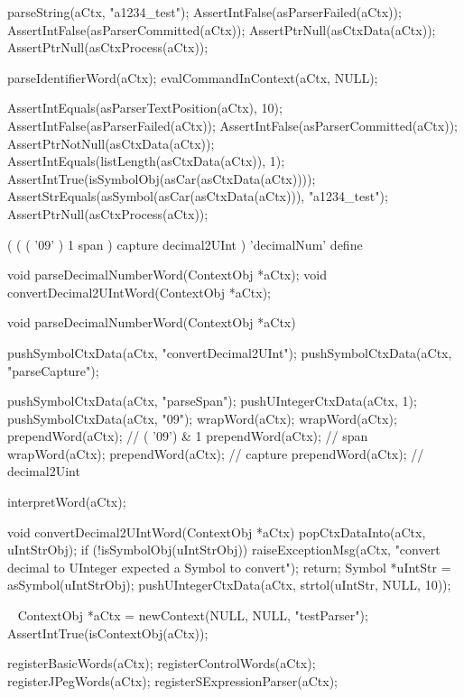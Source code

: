 \startCTest
  parseString(aCtx, "a1234_test");
  AssertIntFalse(asParserFailed(aCtx));
  AssertIntFalse(asParserCommitted(aCtx));
  AssertPtrNull(asCtxData(aCtx));
  AssertPtrNull(asCtxProcess(aCtx));
  
  parseIdentifierWord(aCtx);
  evalCommandInContext(aCtx, NULL);
  
  AssertIntEquals(asParserTextPosition(aCtx), 10);
  AssertIntFalse(asParserFailed(aCtx));
  AssertIntFalse(asParserCommitted(aCtx));
  AssertPtrNotNull(asCtxData(aCtx));
  AssertIntEquals(listLength(asCtxData(aCtx)), 1);
  AssertIntTrue(isSymbolObj(asCar(asCtxData(aCtx))));
  AssertStrEquals(asSymbol(asCar(asCtxData(aCtx))), "a1234_test");
  AssertPtrNull(asCtxProcess(aCtx));
\stopCTest
\stopTestCase
\stopTestSuite

\startTestSuite[parseDecimalNumberWord]

\starttyping
(
  (
    ( '09' ) 1 span
  ) capture decimal2UInt
) 'decimalNum' define
\stoptyping

\startCHeader
void parseDecimalNumberWord(ContextObj *aCtx);
void convertDecimal2UIntWord(ContextObj *aCtx);
\stopCHeader

\startCCode
void parseDecimalNumberWord(ContextObj *aCtx) {

  pushSymbolCtxData(aCtx, "convertDecimal2UInt");
  pushSymbolCtxData(aCtx, "parseCapture");
  
  pushSymbolCtxData(aCtx, "parseSpan");
  pushUIntegerCtxData(aCtx, 1);
  pushSymbolCtxData(aCtx, "09");
  wrapWord(aCtx);
  wrapWord(aCtx);
  prependWord(aCtx); // ( '09') & 1
  prependWord(aCtx); // span
  wrapWord(aCtx);
  prependWord(aCtx); // capture
  prependWord(aCtx); // decimal2Uint
  
  interpretWord(aCtx);
}

void convertDecimal2UIntWord(ContextObj *aCtx) {
  popCtxDataInto(aCtx, uIntStrObj);
  if (!isSymbolObj(uIntStrObj)) {
    raiseExceptionMsg(aCtx,
      "convert decimal to UInteger expected a Symbol to convert");
    return;
  }
  Symbol *uIntStr = asSymbol(uIntStrObj);  
  pushUIntegerCtxData(aCtx, strtol(uIntStr, NULL, 10));
}
\stopCCode

\CTestsSuiteSetup\
\startCTest
  ContextObj *aCtx = newContext(NULL, NULL, "testParser");
  AssertIntTrue(isContextObj(aCtx));
  
  registerBasicWords(aCtx);
  registerControlWords(aCtx);
  registerJPegWords(aCtx);
  registerSExpressionParser(aCtx);
\stopCTest

